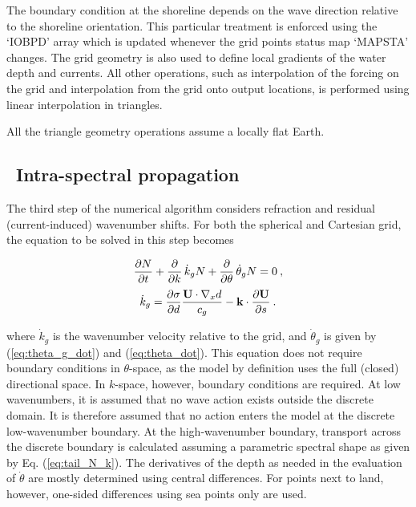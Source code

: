  The boundary condition at the shoreline depends on the 
wave direction relative to the shoreline orientation. This particular treatment is enforced using the `{\F IOBPD}' array 
which is updated whenever the grid points status map `{\F MAPSTA}' changes. The grid geometry is also used to define 
local gradients of the water depth and currents. All other operations, such as interpolation of the forcing 
on the grid and interpolation from the grid onto output locations, is performed using linear interpolation in triangles. 

All the triangle geometry operations assume a locally flat Earth. 



\vssub
\subsection{~Intra-spectral propagation}
\vssub

The third step of the numerical algorithm considers refraction and residual
(current-induced) wavenumber shifts. For both the spherical and Cartesian
grid, the equation to be solved in this step becomes


\begin{equation}
\frac{\partial N}{\partial t} + \frac{\partial}{\partial k} \, \dot{k}_g N +
\frac{\partial}{\partial \theta} \, \dot{\theta}_g N = 0
\: , \label{eq:step_intra} \end{equation} \begin{equation}
\dot{k}_g  = \frac{\partial \sigma}{\partial d} 
    \frac{{\bf U} \cdot \nabla_x d}{c_g}  -
    {\bf k} \cdot \frac{\partial {\bf U}}{\partial s}
\: . \label{eq:k_dot_g} \end{equation}

\noindent
where $\dot{k}_g$ is the wavenumber velocity relative to the grid, and
$\dot{\theta}_g$ is given by (\ref{eq:theta_g_dot}) and (\ref{eq:theta_dot}).
This equation does not require boundary conditions in $\theta$-space, as the
model by definition uses the full (closed) directional space. In $k$-space,
however, boundary conditions are required. At low wavenumbers, it is assumed
that no wave action exists outside the discrete domain. It is therefore
assumed that no action enters the model at the discrete low-wavenumber
boundary. At the high-wavenumber boundary, transport across the discrete
boundary is calculated assuming a parametric spectral shape as given by
Eq. (\ref{eq:tail_N_k}). The derivatives of the depth as needed in the
evaluation of $\dot{\theta}$ are mostly determined using central
differences. For points next to land, however, one-sided differences using sea
points only are used.


